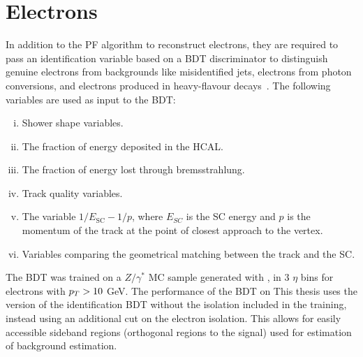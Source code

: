 \section{Electrons}

In addition to the \ac{PF} algorithm to reconstruct electrons, they are required to pass an identification variable based on a \ac{BDT} discriminator to distinguish genuine electrons from backgrounds like misidentified jets, electrons from photon conversions, and electrons produced in heavy-flavour decays~\cite{CMS:2015xaf}.
The following variables are used as input to the \ac{BDT}:

\begin{enumerate}[i)]
\item Shower shape variables.
\item The fraction of energy deposited in the \ac{HCAL}.
\item The fraction of energy lost through bremsstrahlung.
\item Track quality variables.
\item The variable $1/E_{\text{SC}} - 1/p$, where $E_{SC}$ is the \ac{SC} energy and $p$ is the momentum of the track at the point of closest approach to the vertex.
\item Variables comparing the geometrical matching between the track and the \ac{SC}.
\end{enumerate}

The \ac{BDT} was trained on a $Z/\gamma^{*}$ \ac{MC} sample generated with \MADGRAPH, in 3 $\eta$ bins for electrons with $p_{T}>10$ GeV.
The performance of the \ac{BDT} on 
This thesis uses the version of the identification \ac{BDT} without the isolation included in the training, instead using an additional cut on the electron isolation. 
This allows for easily accessible sideband regions (orthogonal regions to the signal) used for estimation of background estimation. \\

